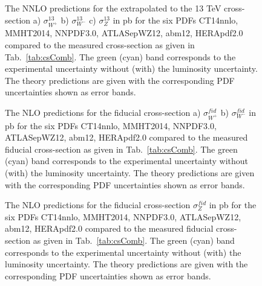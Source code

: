 \begin{figure}[!h]
\begin{minipage}[h]{0.32\linewidth}
\end{minipage}
\hfill
\begin{minipage}[h]{0.32\linewidth}
\end{minipage}
\begin{minipage}[h]{0.32\linewidth}
\end{minipage}
\caption{The NNLO predictions for the extrapolated to the 13 TeV cross-section a) $\sigma^{13}_{W^+}$  b) $\sigma^{13}_{W^-}$  c) $\sigma^{13}_Z$ in pb for the six PDFs CT14nnlo, MMHT2014, NNPDF3.0, ATLASepWZ12, abm12, HERApdf2.0 compared to the measured cross-section as given in Tab.~\ref{tab:csComb}. The green (cyan) band corresponds to the experimental uncertainty without (with) the luminosity uncertainty. The theory predictions are given with the corresponding PDF uncertainties shown as error bands.}
\label{fig:AppD2}
\end{figure}

\begin{figure}[!h]
\begin{minipage}[h]{0.49\linewidth}
\end{minipage}
\hfill
\begin{minipage}[h]{0.49\linewidth}
\end{minipage}
\caption{The NLO predictions for the fiducial cross-section a) $\sigma^{fid}_{W^+}$  b) $\sigma^{fid}_{W^-}$  in pb for the six PDFs CT14nnlo, MMHT2014, NNPDF3.0, ATLASepWZ12, abm12, HERApdf2.0 compared to the measured fiducial cross-section as given in Tab.~\ref{tab:csComb}. The green (cyan) band corresponds to the experimental uncertainty without (with) the luminosity uncertainty. The theory predictions are given with the corresponding PDF uncertainties shown as error bands.}
\label{fig:AppD3}
\end{figure}

\begin{figure}[!h]
\caption{The NLO predictions for the fiducial cross-section $\sigma^{fid}_Z$ in pb for the six PDFs CT14nnlo, MMHT2014, NNPDF3.0, ATLASepWZ12, abm12, HERApdf2.0 compared to the measured fiducial cross-section as given in Tab.~\ref{tab:csComb}. The green (cyan) band corresponds to the experimental uncertainty without (with) the luminosity uncertainty. The theory predictions are given with the corresponding PDF uncertainties shown as error bands.}
\label{fig:AppD4}
\end{figure}


